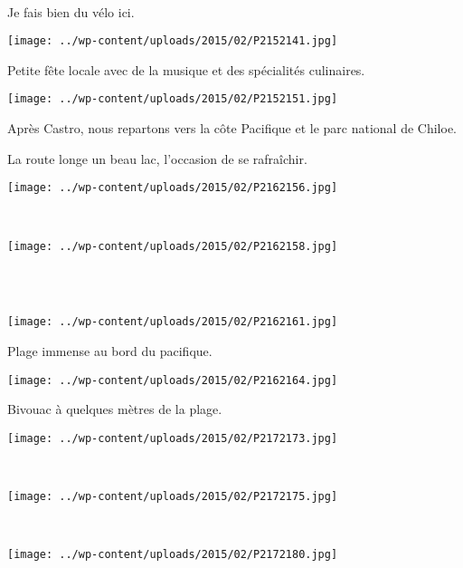 ~

 Je fais bien du vélo ici.\\
\begin{center} \texttt{[image: ../wp-content/uploads/2015/02/P2152141.jpg]} \end{center}
\vspace{-\topsep}

\pagebreak
 Petite fête locale avec de la musique et des spécialités culinaires.
\begin{center} \texttt{[image: ../wp-content/uploads/2015/02/P2152151.jpg]} \end{center}

 Après Castro, nous repartons vers la côte Pacifique et le parc national de Chiloe.

 La route longe un beau lac, l'occasion de se rafraîchir.
\begin{center} \texttt{[image: ../wp-content/uploads/2015/02/P2162156.jpg]} \end{center}
\vspace{-\topsep}

\pagebreak
~
\begin{center} \texttt{[image: ../wp-content/uploads/2015/02/P2162158.jpg]} \end{center}
~\\

~
\begin{center} \texttt{[image: ../wp-content/uploads/2015/02/P2162161.jpg]} \end{center}
\vspace{-\topsep}

\pagebreak
 Plage immense au bord du pacifique.
\begin{center} \texttt{[image: ../wp-content/uploads/2015/02/P2162164.jpg]} \end{center}

 Bivouac à quelques mètres de la plage.
\begin{center} \texttt{[image: ../wp-content/uploads/2015/02/P2172173.jpg]} \end{center}
\vspace{-\topsep}

\pagebreak
~
\begin{center} \texttt{[image: ../wp-content/uploads/2015/02/P2172175.jpg]} \end{center}
~
\begin{center} \texttt{[image: ../wp-content/uploads/2015/02/P2172180.jpg]} \end{center}
\vspace{-\topsep}

